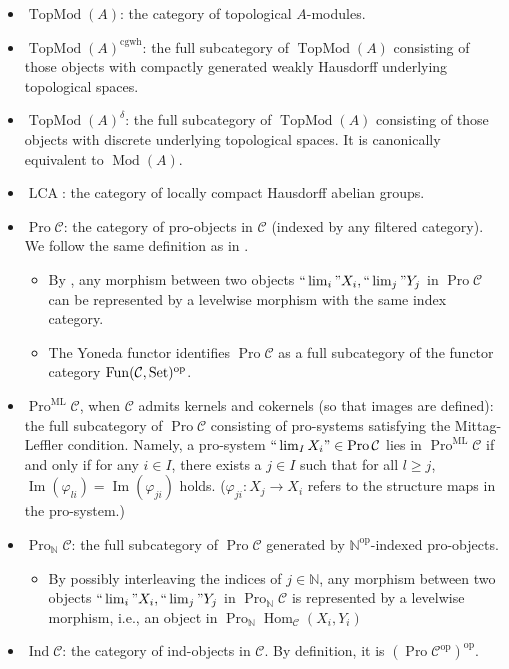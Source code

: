 \documentclass[11pt]{amsart}
\newcommand{\ra}{\rightarrow} %
\newcommand{\N}{\mathbb{N}}
\newcommand{\cC}{\mathcal{C}} %
\newcommand{\Set}{{\operatorname{\mathrm{Set}}}}
\newcommand{\Hom}{\operatorname{Hom}}
\renewcommand{\Im}{\operatorname{Im}}
\newcommand{\Mod}{\operatorname{Mod}}
\newcommand{\cgwh}{\operatorname{cgwh}}
\newcommand{\ML}{\operatorname{ML}}
\newcommand{\TopMod}{\operatorname{TopMod}}
\newcommand{\op}{{\operatorname{op}}}
\renewcommand{\lim}{\operatornamewithlimits{\rm{lim}}}
\newcommand{\LCA}{\operatorname{LCA}}
\renewcommand{\phi}{{\varphi}}
\newcommand{\Pro}{\operatorname{Pro}}
\newcommand{\Ind}{\operatorname{Ind}}
\theoremstyle{plain}
\theoremstyle{definition}
\numberwithin{equation}{prop}
\begin{document}
\begin{itemize}
\item 
$\TopMod(A)$: the category of topological $A$-modules.
\item 
$\TopMod(A)^{\cgwh}$: the full subcategory of $\TopMod(A)$ consisting of those objects with compactly generated weakly Hausdorff underlying topological spaces.
\item 
$\TopMod(A)^\delta$: the full subcategory of $\TopMod(A)$ consisting of those objects with discrete underlying topological spaces.
It is canonically equivalent to $\Mod(A)$.
\item 
$\LCA$: the category of locally compact Hausdorff abelian groups. 
\item 
$\Pro\cC$: the category of pro-objects in $\cC$ (indexed by any filtered category). 
We follow the same definition as in \cite[\S A.2]{AM}. 
\begin{itemize}
\item 
By \cite[A. Corollary 3.2]{AM}, any morphism between two objects $``\lim_i"X_i,``\lim_j"Y_j$ in $\Pro\cC$ can be represented by a levelwise morphism with the same index category.
\item 
The Yoneda functor identifies $\Pro\cC$ as a full subcategory of the functor category ${\rm Fun}(\cC,\Set)^{\op}$. 
\end{itemize}
\item 
$\Pro^{\ML}\cC$, when $\cC$ admits kernels and cokernels (so that images are defined): the full subcategory of $\Pro\cC$ consisting of pro-systems satisfying the Mittag-Leffler condition. 
Namely, a pro-system $``\lim_I X_i"\in\Pro\cC$ lies in $\Pro^{\ML}\cC$ if and only if
for any $i\in I$, there exists a $j\in I$ such that for all $l\ge j$,
$\Im(\phi_{li})=\Im(\phi_{ji})$ holds. ($\phi_{ji}:X_j\ra X_i$ refers to the structure maps in the pro-system.)
\item 
$\Pro_{\N}\cC$: the full subcategory of $\Pro\cC$ generated by $\N^\op$-indexed pro-objects.
\begin{itemize}
\item 
By possibly interleaving the indices of $j\in \N$, any morphism between two objects $``\lim_i"X_i,``\lim_j"Y_j$ in $\Pro_{\N}\cC$ is represented by a levelwise morphism, i.e., an object in $\Pro_{\N}\Hom_{\cC}(X_i,Y_i)$
\end{itemize}
\item 
$\Ind\cC$: the category of ind-objects in $\cC$. By definition, it is $(\Pro\cC^{\op})^{\op}.$

\end{itemize}
\end{document}
